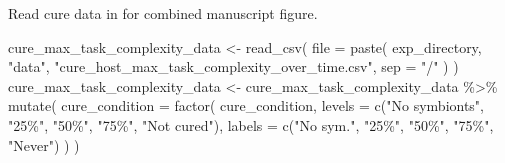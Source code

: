 \documentclass[
]{book}
\newenvironment{Shaded}{\begin{snugshade}}{\end{snugshade}}
\newcommand{\AttributeTok}[1]{\textcolor[rgb]{0.77,0.63,0.00}{#1}}
\newcommand{\FunctionTok}[1]{\textcolor[rgb]{0.00,0.00,0.00}{#1}}
\newcommand{\NormalTok}[1]{#1}
\newcommand{\OtherTok}[1]{\textcolor[rgb]{0.56,0.35,0.01}{#1}}
\newcommand{\SpecialCharTok}[1]{\textcolor[rgb]{0.00,0.00,0.00}{#1}}
\newcommand{\StringTok}[1]{\textcolor[rgb]{0.31,0.60,0.02}{#1}}
\begin{document}
Read cure data in for combined manuscript figure.

\begin{Shaded}
\begin{Highlighting}[]
\NormalTok{cure\_max\_task\_complexity\_data }\OtherTok{\textless{}{-}} \FunctionTok{read\_csv}\NormalTok{(}
  \AttributeTok{file =} \FunctionTok{paste}\NormalTok{(}
\NormalTok{    exp\_directory,}
    \StringTok{"data"}\NormalTok{,}
    \StringTok{"cure\_host\_max\_task\_complexity\_over\_time.csv"}\NormalTok{,}
    \AttributeTok{sep =} \StringTok{"/"}
\NormalTok{  )}
\NormalTok{)}
\NormalTok{cure\_max\_task\_complexity\_data }\OtherTok{\textless{}{-}}\NormalTok{ cure\_max\_task\_complexity\_data }\SpecialCharTok{\%\textgreater{}\%}
  \FunctionTok{mutate}\NormalTok{(}
    \AttributeTok{cure\_condition =} \FunctionTok{factor}\NormalTok{(}
\NormalTok{      cure\_condition,}
      \AttributeTok{levels =} \FunctionTok{c}\NormalTok{(}\StringTok{"No symbionts"}\NormalTok{, }\StringTok{"25\%"}\NormalTok{, }\StringTok{"50\%"}\NormalTok{, }\StringTok{"75\%"}\NormalTok{, }\StringTok{"Not cured"}\NormalTok{),}
      \AttributeTok{labels =} \FunctionTok{c}\NormalTok{(}\StringTok{"No sym."}\NormalTok{, }\StringTok{"25\%"}\NormalTok{, }\StringTok{"50\%"}\NormalTok{, }\StringTok{"75\%"}\NormalTok{, }\StringTok{"Never"}\NormalTok{)}
\NormalTok{    )}
\NormalTok{  )}
\end{Highlighting}
\end{Shaded}
\end{document}
